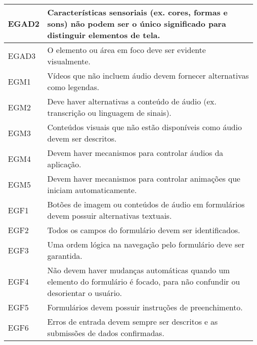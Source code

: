 \begin{table}[htb]
\begin{center}
\begin{tabular}{p{1.0cm}|p{13.0cm}}
      \hline
      EGAD2           & Características sensoriais (ex.\: cores, formas e sons) não podem ser o único significado para distinguir elementos de tela.                 \\
      \hline
      EGAD3           & O elemento ou área em foco deve ser evidente visualmente.                                                                                    \\
      \hline
      EGM1            & Vídeos que não incluem áudio devem fornecer alternativas como legendas.                                                                      \\
      \hline
      EGM2            & Deve haver alternativas a conteúdo de áudio (ex.\: transcrição ou linguagem de sinais).                                                      \\
      \hline
      EGM3            & Conteúdos visuais que não estão disponíveis como áudio devem ser descritos.                                                                  \\
      \hline
      EGM4            & Devem haver mecanismos para controlar áudios da aplicação.                                                                                   \\
      \hline
      EGM5            & Devem haver mecanismos para controlar animações que iniciam automaticamente.                                                                 \\
      \hline
      EGF1            & Botões de imagem ou conteúdos de áudio em formulários devem possuir alternativas textuais.                                                   \\
      \hline
      EGF2            & Todos os campos do formulário devem ser identificados.                                                                                       \\
      \hline
      EGF3            & Uma ordem lógica na navegação pelo formulário deve ser garantida.                                                                            \\
      \hline
      EGF4            & Não devem haver mudanças automáticas quando um elemento do formulário é focado, para não confundir ou desorientar o usuário.                 \\
      \hline
      EGF5            & Formulários devem possuir instruções de preenchimento.                                                                                       \\
      \hline
      EGF6            & Erros de entrada devem sempre ser descritos e as submissões de dados confirmadas.                                                            \\
    \end{tabular}
  \end{center}
\end{table}

